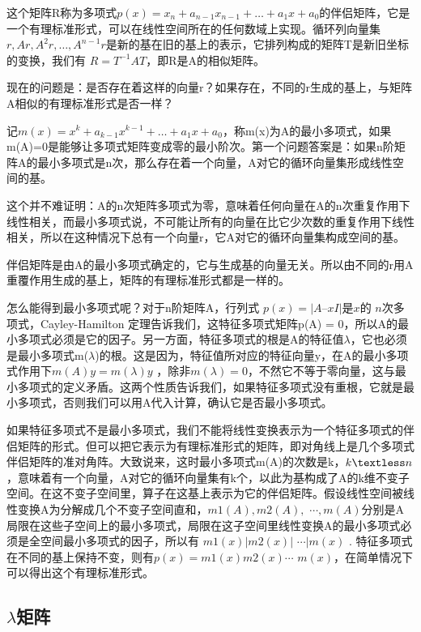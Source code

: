 	这个矩阵R称为多项式$  p(x) =x_n +a_{n-1}x_{n-1} + … + a_1x + a_0 $的伴侣矩阵，它是一个有理标准形式，可以在线性空间所在的任何数域上实现。循环列向量集 $ {r , Ar, A^2r, …, A^{n-1}r}  $是新的基在旧的基上的表示，它排列构成的矩阵T是新旧坐标的变换，我们有 $ R = T^{-1}AT $，即R是A的相似矩阵。
	
	现在的问题是：是否存在着这样的向量r？如果存在，不同的r生成的基上，与矩阵A相似的有理标准形式是否一样？
	
	记$ m(x) = x^k+a_{k-1}x^{k-1} + … + a_1x + a_0 $，称m(x)为A的最小多项式，如果m(A)=0是能够让多项式矩阵变成零的最小阶次。第一个问题答案是：如果n阶矩阵A的最小多项式是n次，那么存在着一个向量，A对它的循环向量集形成线性空间的基。
	
	这个并不难证明：A的n次矩阵多项式为零，意味着任何向量在A的n次重复作用下线性相关，而最小多项式说，不可能让所有的向量在比它少次数的重复作用下线性相关，所以在这种情况下总有一个向量r，它A对它的循环向量集构成空间的基。
	
	伴侣矩阵是由A的最小多项式确定的，它与生成基的向量无关。所以由不同的r用A重覆作用生成的基上，矩阵的有理标准形式都是一样的。
	
	怎么能得到最小多项式呢？对于n阶矩阵A，行列式 $ p(x)  = |A – xI| $是$ x $的 $ n $次多项式，Cayley-Hamilton 定理告诉我们，这特征多项式矩阵p(A) = 0，所以A的最小多项式必须是它的因子。另一方面，特征多项式的根是A的特征值$ \lambda $，它也必须是最小多项式m($ \lambda $)的根。这是因为，特征值所对应的特征向量y，在A的最小多项式作用下$  m(A)y = m(\lambda)y $ ，除非$ m(\lambda)=0 $，不然它不等于零向量，这与最小多项式的定义矛盾。这两个性质告诉我们，如果特征多项式没有重根，它就是最小多项式，否则我们可以用A代入计算，确认它是否最小多项式。
	
	如果特征多项式不是最小多项式，我们不能将线性变换表示为一个特征多项式的伴侣矩阵的形式。但可以把它表示为有理标准形式的矩阵，即对角线上是几个多项式伴侣矩阵的准对角阵。大致说来，这时最小多项式m(A)的次数是k，$ k  \textless n $，意味着有一个向量，A对它的循环向量集有k个，以此为基构成了A的k维不变子空间。在这不变子空间里，算子在这基上表示为它的伴侣矩阵。假设线性空间被线性变换A为分解成几个不变子空间直和，$ m1(A), m2(A),$   $\cdots, m(A) $分别是A局限在这些子空间上的最小多项式，局限在这子空间里线性变换A的最小多项式必须是全空间最小多项式的因子，所以有 $ m1(x) | m2(x) |$   $\cdots | m(x) $ . 特征多项式在不同的基上保持不变，则有$ p(x)= m1(x) m2(x) \cdots$   $m(x) $，在简单情况下可以得出这个有理标准形式。
	
	\subsection{$\lambda$矩阵}
	

